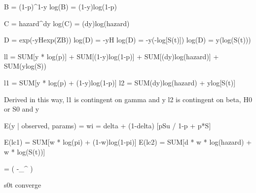 B = (1-p)^{1-y}
log(B) = (1-y)log(1-p)

C = {hazard}^dy
log(C) = (dy)log(hazard)

D = exp(-yHexp(ZB))
log(D) = -yH
log(D) = -y(-log[S(t)])
log(D) = y(log(S(t)))

ll = SUM[y * log(p)] + SUM[(1-y)log(1-p)] + SUM[(dy)log(hazard)] + SUM(ylog(S))

l1 = SUM[y * log(p) + (1-y)log(1-p)]
l2 = SUM{(dy)log(hazard) + ylog[S(t)]} %

Derived in this way, l1 is contingent on gamma and y
l2 is contingent on beta, H0 or S0 and y

E(y | observed, params) =  wi = delta + (1-delta) [pSu / 1-p + p*S]

E(lc1) = SUM[w * log(pi) + (1-w)log(1-pi)]
E(lc2) = SUM[d * w * log(hazard) + w * log(S(t))] %


	

	\sohat = \exp\bigg(
	-\sum_{}^{}
	)
	
	s0t converge